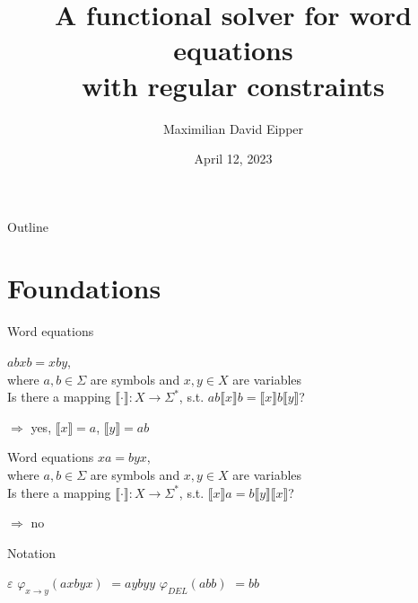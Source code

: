 \documentclass[xcolor=table]{beamer}
\title{A functional solver for word equations \\ with regular constraints}
\author{Maximilian David Eipper}
\date{April 12, 2023}
\newcommand{\assignment}[1]{\llbracket #1 \rrbracket}
\begin{document}
\begin{frame}
    \titlepage 
\end{frame}

\logo{}


\begin{frame}{Outline}
    \tableofcontents
\end{frame}

\section{Foundations}

\begin{frame}{Word equations}
\pause

$abxb = xby$, \\
where $a, b \in \Sigma$ are symbols and $x, y \in X$ are variables \\

\pause
Is there a mapping $\assignment{\cdot}: X \rightarrow \Sigma^*$, s.t. $ab\assignment{x}b = \assignment{x}b\assignment{y}$?

\pause
$\Rightarrow$ yes, $\assignment{x} = a$, $\assignment{y} = ab$
\end{frame}

\begin{frame}{Word equations}
$xa = byx$, \\
where $a, b \in \Sigma$ are symbols and $x, y \in X$ are variables \\

\pause
Is there a mapping $\assignment{\cdot}: X \rightarrow \Sigma^*$, s.t. $\assignment{x}a = b\assignment{y}\assignment{x}$?

\pause
$\Rightarrow$ no
\end{frame}

\begin{frame}{Notation}
\begin{outline}
    \pause
    \1 $\varepsilon$
    \pause
    \1 $\varphi_{x \rightarrow y}$\pause$(axbyx)$ \pause $= aybyy$
    \pause
    \1 $\varphi_{DEL}$\pause$(abb)$ \pause $= bb$
\end{outline}
\end{frame}
\end{document}
